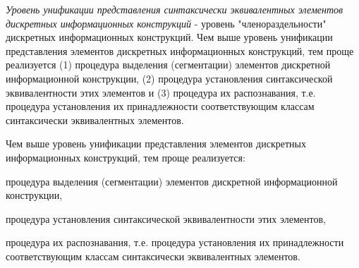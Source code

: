 \begin{SCn}

    \begin{scnindent}
        \begin{scnindent}
        \end{scnindent}
        \begin{scnindent}
        \end{scnindent}
    \end{scnindent}

\end{SCn}

\textit{Уровень унификации представления синтаксически эквивалентных элементов дискретных информационных конструкций\scnsupergroupsign} - уровень "членораздельности"{} дискретных информационных конструкций. Чем выше уровень унификации представления элементов дискретных информационных конструкций, тем проще реализуется (1) процедура выделения (сегментации) элементов дискретной информационной конструкции, (2) процедура установления синтаксической эквивалентности этих элементов и (3) процедура их распознавания, т.е. процедура установления их принадлежности соответствующим классам синтаксически эквивалентных элементов.

Чем выше уровень унификации представления элементов дискретных информационных конструкций, тем проще реализуется:
\begin{textitemize}
    \item процедура выделения (сегментации) элементов дискретной информационной конструкции,
    \item процедура установления синтаксической эквивалентности этих элементов,
    \item процедура их распознавания, т.е. процедура установления их принадлежности соответствующим классам синтаксически эквивалентных элементов.
\end{textitemize}

